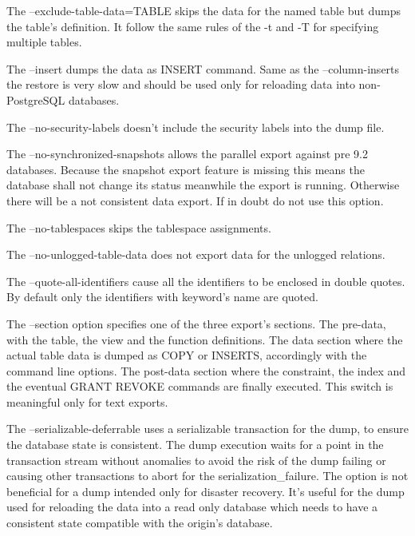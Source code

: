The --exclude-table-data=TABLE skips the data for the named table but dumps the table's definition. 
It follow the same rules of the -t and -T for specifying multiple tables.\newline

The --insert dumps the data as INSERT command. Same as the --column-inserts the restore is very 
slow and should be used only for reloading data into non-PostgreSQL databases.\newline

The --no-security-labels doesn't include the security labels into the dump file.\newline

The --no-synchronized-snapshots  allows the parallel export against pre 9.2 databases. Because the 
snapshot export feature is missing this means the database shall not change its status meanwhile 
the export is running. Otherwise there will be a not consistent data export. If in doubt do not 
use this option.\newline

The --no-tablespaces skips the tablespace assignments.\newline

The --no-unlogged-table-data does not export data for the unlogged relations.\newline

The --quote-all-identifiers  cause all the identifiers to be enclosed in double quotes. By default 
only the identifiers with keyword's name are quoted.\newline

The --section option specifies one of the three export's sections. The pre-data, with the 
table, the view and the function definitions. The data section where the actual table data is 
dumped as COPY or INSERTS, accordingly with the command line options. The post-data section 
where the constraint, the index and the eventual GRANT REVOKE commands are finally executed. This 
switch is meaningful only for text exports. \newline

The --serializable-deferrable uses a serializable transaction for the dump, to ensure the database 
state is consistent. The dump execution waits for a point in the transaction stream without 
anomalies to avoid the risk of the dump failing or causing other transactions to abort for the 
serialization\_failure. The option is not beneficial for a dump intended only for disaster 
recovery. It's useful for the dump used for reloading the data into a read only database which 
needs to have a consistent state compatible with the origin's database.\newline

